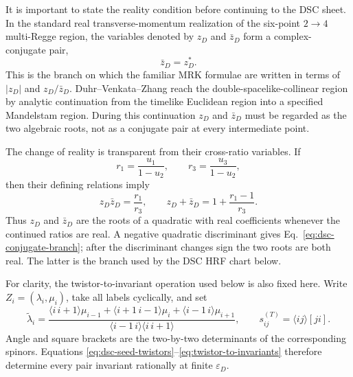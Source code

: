 \documentclass[11pt]{article}
\begin{document}
It is important to state the reality condition before continuing to the
DSC sheet.  In the standard real transverse-momentum realization of the
six-point \(2\to4\) multi-Regge region, the variables denoted by \(z_D\) and
\(\bar z_D\) form a complex-conjugate pair,
\begin{equation}
 \bar z_D=z_D^*.
 \label{eq:dsc-conjugate-branch}
\end{equation}
This is the branch on which the familiar MRK formulae are written in terms
of \(|z_D|\) and \(z_D/\bar z_D\).  Duhr--Venkata--Zhang reach the
double-spacelike-collinear region by analytic continuation from the timelike
Euclidean region into a specified Mandelstam region.  During this
continuation \(z_D\) and \(\bar z_D\) must be regarded as the two algebraic
roots, not as a conjugate pair at every intermediate point.

The change of reality is transparent from their cross-ratio variables.  If
\begin{equation}
 r_1=\frac{u_1}{1-u_2},\qquad r_3=\frac{u_3}{1-u_2},
\end{equation}
then their defining relations imply
\begin{equation}
 z_D\bar z_D=\frac{r_1}{r_3},\qquad
 z_D+\bar z_D=1+\frac{r_1-1}{r_3}.
 \label{eq:dsc-root-sum-product}
\end{equation}
Thus \(z_D\) and \(\bar z_D\) are the roots of a quadratic with real
coefficients whenever the continued ratios are real.  A negative quadratic
discriminant gives Eq.~\eqref{eq:dsc-conjugate-branch}; after the
discriminant changes sign the two roots are both real.  The latter is the
branch used by the DSC HRF chart below.

For clarity, the twistor-to-invariant operation used below is also fixed
here.  Write \(Z_i=(\lambda_i,\mu_i)\), take all labels cyclically, and set
\begin{equation}
 \widetilde\lambda_i=
 \frac{\langle i\,i{+}1\rangle\mu_{i-1}
 +\langle i{+}1\,i{-}1\rangle\mu_i
 +\langle i{-}1\,i\rangle\mu_{i+1}}
 {\langle i{-}1\,i\rangle\langle i\,i{+}1\rangle},
 \qquad
 s_{ij}^{(T)}=\langle ij\rangle[ji].
 \label{eq:twistor-to-invariants}
\end{equation}
Angle and square brackets are the two-by-two determinants of the
corresponding spinors.  Equations
\eqref{eq:dsc-seed-twistors}--\eqref{eq:twistor-to-invariants} therefore
determine every pair invariant rationally at finite \(\varepsilon_D\).
\end{document}
